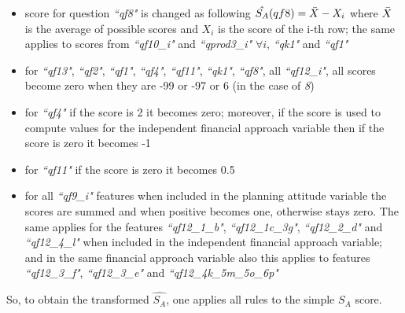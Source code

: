 \documentclass[a4paper,11pt]{article}
\begin{document}
\begin{itemize}
    \item score for question \textit{``qf8"} is changed as following $\hat{S_A}(qf8)=\Bar{X}-X_i$ where $\Bar{X}$ is the average of possible scores and $X_i$ is the score of the i-th row; the same applies to scores from \textit{``qf10\_i"} and \textit{``qprod3\_i"} 
    $\forall i$, \textit{``qk1"} and \textit{``qf1"}
    
    \item for \textit{``qf13"}, \textit{``qf2"}, \textit{``qf1"}, \textit{``qf4"}, \textit{``qf11"}, \textit{``qk1"}, \textit{``qf8"}, all \textit{``qf12\_i"}, all scores become zero when they are -99 or -97 or 6 (in the case of \textit{8})
    
    \item for \textit{``qf4"} if the score is 2 it becomes zero; moreover, if the score is used to compute values for the independent financial approach variable then if the score is zero it becomes -1

    \item for \textit{``qf11"} if the score is zero it becomes 0.5

    \item for all \textit{``qf9\_i"} features when included in the planning attitude variable the scores are summed and when positive becomes one, otherwise stays zero. The same applies for the features \textit{``qf12\_1\_b"}, \textit{``qf12\_1c\_3g"}, \textit{``qf12\_2\_d"} and \textit{``qf12\_4\_l"} when included in the independent financial approach variable; and in the same financial approach variable also this applies to features \textit{``qf12\_3\_f"}, \textit{``qf12\_3\_e"} and \textit{``qf12\_4k\_5m\_5o\_6p"}
\end{itemize}
So, to obtain the transformed $\hat{S_A}$, one applies all rules to the simple $S_A$ score.

\newpage
\printbibliography
\end{document}
